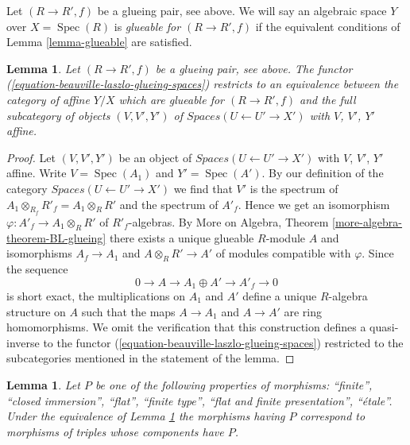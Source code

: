 \documentclass{stacks-project}
\theoremstyle{plain}
\newtheorem{lemma}[subsection]{Lemma}
\theoremstyle{definition}
\theoremstyle{remark}
\numberwithin{equation}{subsection}
\def\Spec{\mathop{\mathrm{Spec}}}
\begin{document}
\noindent
Let $(R \to R', f)$ be a glueing pair, see above.
We will say an algebraic space $Y$ over $X = \Spec(R)$
is {\it glueable for $(R \to R', f)$}
if the equivalent conditions of Lemma \ref{lemma-glueable}
are satisfied.

\begin{lemma}
\label{lemma-glueing-affines}
Let $(R \to R', f)$ be a glueing pair, see above.
The functor (\ref{equation-beauville-laszlo-glueing-spaces})
restricts to an equivalence between the category of affine
$Y/X$ which are glueable for $(R \to R', f)$ and the
full subcategory of objects $(V, V', Y')$ of
$\textit{Spaces}(U \leftarrow U' \to X')$
with $V$, $V'$, $Y'$ affine.
\end{lemma}

\begin{proof}
Let $(V, V', Y')$ be an object of
$\textit{Spaces}(U \leftarrow U' \to X')$
with $V$, $V'$, $Y'$ affine.
Write $V = \Spec(A_1)$ and $Y' = \Spec(A')$. By our definition of the
category $\textit{Spaces}(U \leftarrow U' \to X')$ we find that
$V'$ is the spectrum of $A_1 \otimes_{R_f} R'_f = A_1 \otimes_R R'$
and the spectrum of $A'_f$. Hence we get an isomorphism
$\varphi : A'_f \to A_1 \otimes_R R'$ of $R'_f$-algebras.
By More on Algebra, Theorem \ref{more-algebra-theorem-BL-glueing}
there exists a unique glueable $R$-module $A$ and isomorphisms
$A_f \to A_1$ and $A \otimes_R R' \to A'$ of modules compatible with
$\varphi$. Since the sequence
$$
0 \to A \to A_1 \oplus A' \to A'_f \to 0
$$
is short exact, the multiplications on $A_1$ and $A'$ define
a unique $R$-algebra structure on $A$ such that the maps $A \to A_1$
and $A \to A'$ are ring homomorphisms. We omit the verification
that this construction defines a quasi-inverse to the functor
(\ref{equation-beauville-laszlo-glueing-spaces})
restricted to the subcategories mentioned in the statement of the lemma.
\end{proof}

\begin{lemma}
\label{lemma-glueing-affines-etale}
Let $P$ be one of the following properties of morphisms:
``finite'', ``closed immersion'', ``flat'', ``finite type'',
``flat and finite presentation'', ``\'etale''.
Under the equivalence of Lemma \ref{lemma-glueing-affines}
the morphisms having $P$ correspond to morphisms of triples
whose components have $P$.
\end{lemma}
\end{document}
